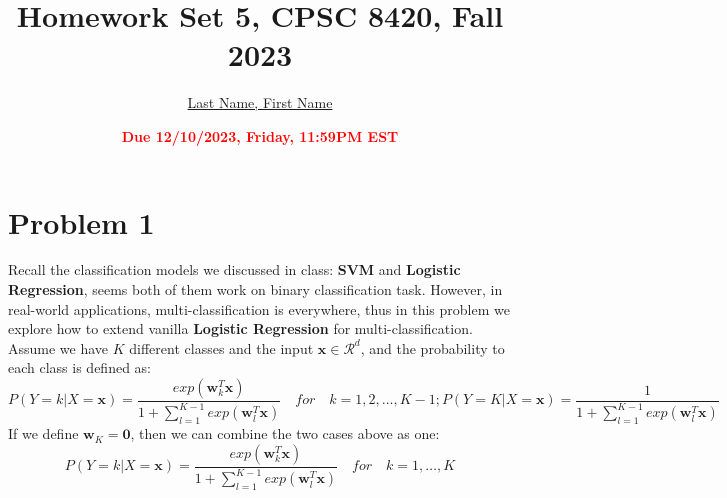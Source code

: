 \documentclass[11pt]{article}
\title{{\bf Homework Set 5, CPSC 8420, Fall 2023}} %
\author{\Large\underline{Last Name, First Name}}
\date{\textbf{\Large\textcolor{red}{Due 12/10/2023, Friday, 11:59PM EST}}} %
\newcommand{\vct}[1]{\mathbf{#1}}
\def \vzero    {\vct{0}}
\def \vw {\vct{w}}
\def \vx {\vct{x}}
\begin{document}
\maketitle
\section*{Problem 1}
Recall the classification models we discussed in class: \textbf{SVM} and \textbf{Logistic Regression}, seems both of them work on binary classification task. However, in real-world applications, multi-classification is everywhere, thus in this problem we explore how to extend vanilla \textbf{Logistic Regression} for multi-classification. Assume we have $K$ different classes and the input $
\vx\in\mathcal{R}^d$, and the probability to each class is defined as:
\begin{equation}
		P(Y=k|X=\vx) =  \frac{exp(\vw_k^T\vx)}{ 1+\sum_{l=1}^{K-1}exp(\vw_l^T\vx)} \quad for  \quad k=1,2,\dots,K-1; P(Y=K|X=\vx) =  \frac{1} { 1+\sum_{l=1}^{K-1}exp(\vw_l^T\vx)}
\end{equation}
If we define $\vw_K=\vzero$, then we can combine the two cases above as one:
\begin{equation}
	P(Y=k|X=\vx) =  \frac{exp(\vw_k^T\vx)}{ 1+\sum_{l=1}^{K-1}exp(\vw_l^T\vx)} \quad for  \quad k=1,\dots,K
\end{equation}
\end{document}
